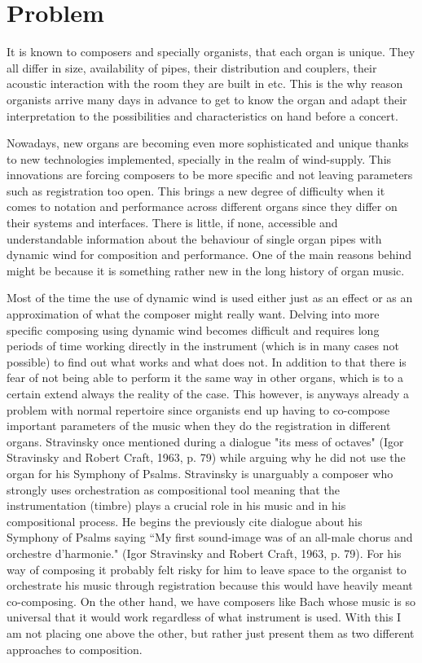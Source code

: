 \section{Problem}

It is known to composers and specially organists, that each organ is unique. They all differ in size, availability of pipes, their distribution and couplers, their acoustic interaction with the room they are built in etc. This is the why reason organists arrive many days in advance to get to know the organ and adapt their interpretation to the possibilities and characteristics on hand before a concert. 

Nowadays, new organs are becoming even more sophisticated and unique thanks to new technologies implemented, specially in the realm of wind-supply. This innovations are forcing composers to be more specific and not leaving parameters such as registration too open.  This brings a new degree of difficulty when it comes to notation and performance across different organs since they differ on their systems and interfaces. There is little, if none, accessible and understandable information about the behaviour of single organ pipes with dynamic wind for composition and performance. One of the main reasons behind might be because it is something rather new in the long history of organ music. 

Most of the time the use of dynamic wind is used either just as an effect or as an approximation of what the composer might really want. Delving into more specific composing using dynamic wind becomes difficult and requires long periods of time working directly in the instrument (which is in many cases not possible) to find out what works and what does not. In addition to that there is fear of not being able to perform it the same way in other organs, which is to a certain extend always the reality of the case. This however, is anyways already a problem with normal repertoire since organists end up having to co-compose important parameters of the music when they do the registration in different organs. Stravinsky once mentioned during a dialogue "its mess of octaves" (Igor Stravinsky and Robert Craft, 1963, p. 79) while arguing why he did not use the organ for his Symphony of Psalms. Stravinsky is unarguably a composer who strongly uses orchestration as compositional tool meaning that the instrumentation (timbre) plays a crucial role in his music and in his compositional process. He begins the previously cite dialogue about his Symphony of Psalms saying “My first sound-image was of an all-male chorus and orchestre d'harmonie." (Igor Stravinsky and Robert Craft, 1963, p. 79). For his way of composing it probably felt risky for him to leave space to the organist to orchestrate his music through registration because this would have heavily meant co-composing. On the other hand, we have composers like Bach whose music is so universal that it would work regardless of what instrument is used. With this I am not placing one above the other, but rather just present them as two different approaches to composition. 

